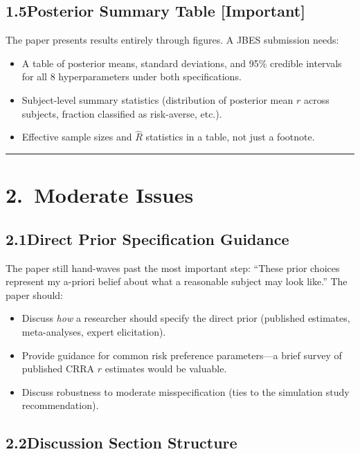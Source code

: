 \documentclass[12pt,a4paper]{article}
\begin{document}
\subsection{1.5\quad Posterior Summary Table [Important]}

The paper presents results entirely through figures.  A JBES submission needs:
\begin{itemize}[leftmargin=1.5em]
\item A table of posterior means, standard deviations, and 95\% credible
intervals for all 8 hyperparameters under both specifications.

\item Subject-level summary statistics (distribution of posterior mean $r$
across subjects, fraction classified as risk-averse, etc.).

\item Effective sample sizes and $\hat{R}$ statistics in a table, not just a
footnote.
\end{itemize}

\vspace{0.5em}
\hrule
\vspace{0.5em}

\section{2.\ Moderate Issues}

\subsection{2.1\quad Direct Prior Specification Guidance}

The paper still hand-waves past the most important step: ``These prior choices
represent my a-priori belief about what a reasonable subject may look like.''
The paper should:
\begin{itemize}[leftmargin=1.5em]
\item Discuss \emph{how} a researcher should specify the direct prior (published
estimates, meta-analyses, expert elicitation).
\item Provide guidance for common risk preference parameters---a brief survey of
published CRRA $r$ estimates would be valuable.
\item Discuss robustness to moderate misspecification (ties to the simulation
study recommendation).
\end{itemize}

\subsection{2.2\quad Discussion Section Structure}
\end{document}
